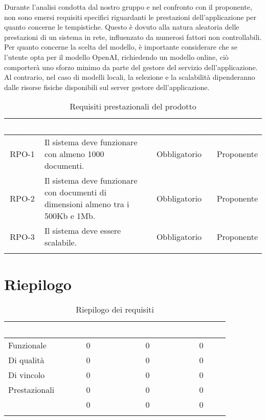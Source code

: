 Durante l'analisi condotta dal nostro gruppo e nel confronto con il proponente, non sono emersi requisiti specifici riguardanti le prestazioni dell'applicazione per quanto concerne le tempistiche. Questo è dovuto alla natura aleatoria delle prestazioni di un sistema in rete, influenzato da numerosi fattori non controllabili.\\Per quanto concerne la scelta del modello, è importante considerare che se l'utente opta per il modello OpenAI, richiedendo un modello online, ciò comporterà uno sforzo minimo da parte del gestore del servizio dell'applicazione. Al contrario, nel caso di modelli locali, la selezione e la scalabilità dipenderanno dalle risorse fisiche disponibili sul server gestore dell'applicazione.\\
\begingroup
\setlength{\tabcolsep}{10pt}
\renewcommand{\arraystretch}{1.5}
\begin{xltabular}{\textwidth}{| c | X | c | c |}
    \hline
     \textbf{\textcolor{white}{Codice}} & \textbf{\textcolor{white}{Descrizione}} & \textbf{\textcolor{white}{Classificazione}} & \textbf{\textcolor{white}{Fonte}}\\
    \hline
    \endhead
    RPO-1 & Il sistema deve funzionare con almeno 1000 documenti.  & Obbligatorio & Proponente\\
    \hline
    RPO-2 & Il sistema deve funzionare con documenti di dimensioni almeno tra i 500Kb e 1Mb. & Obbligatorio & Proponente\\
    \hline
    RPO-3 & Il sistema deve essere scalabile. & Obbligatorio & Proponente\\
    \hline
     \caption{Requisiti prestazionali del prodotto}
    \label{tab:reqpre}
\end{xltabular}
\endgroup

\section{Riepilogo}
\begingroup
\setlength{\tabcolsep}{10pt}
\renewcommand{\arraystretch}{1.5}
\begin{xltabular}{\textwidth}{| X | c | c | c |}
    \hline
     \textbf{\textcolor{white}{Requisito}} & \textbf{\textcolor{white}{Obbligatorio}} & \textbf{\textcolor{white}{Desiderabile}} & \textbf{\textcolor{white}{Opzionale}}\\
    \hline
    \endhead
    Funzionale & 0 & 0 & 0 \\
    \hline
    Di qualità & 0 & 0 & 0 \\
    \hline
    Di vincolo & 0 & 0 & 0 \\
    \hline
    Prestazionali & 0 & 0 & 0 \\
    \hline
     \textbf{\textcolor{white}{Totale}} & 0 & 0 & 0 \\
    \hline
    
     \caption{Riepilogo dei requisiti}
    \label{tab:riepilogo}
\end{xltabular}
\endgroup

